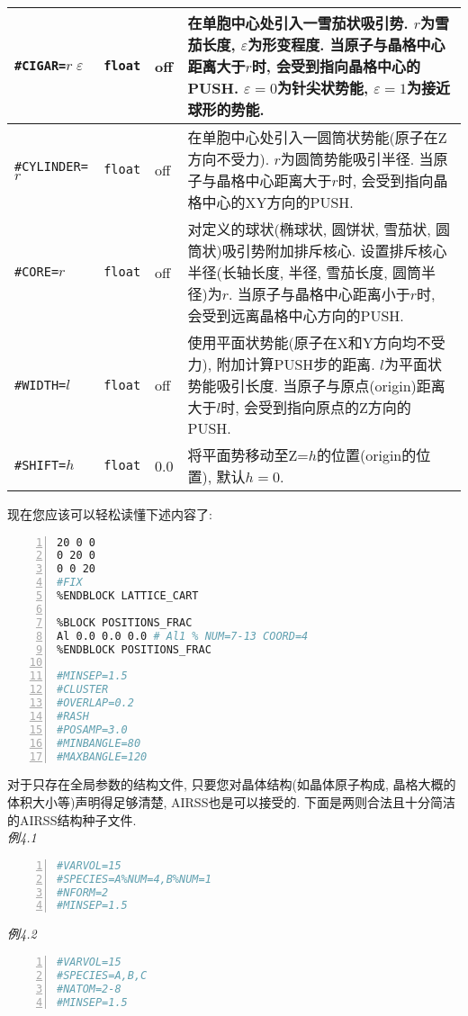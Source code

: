 \documentclass[a4paper, 10pt]{article}
\begin{document}
\begin{center}
\begin{longtable}{m{10em}|m{4em}<{\centering}|m{3em}<{\centering}|m{15em}}
\midrule
\verb|#CIGAR=|\(r\;\varepsilon\) & \verb|float| & off & 在单胞中心处引入一雪茄状吸引势. \(r\)为雪茄长度, \(\varepsilon\)为形变程度. 当原子与晶格中心距离大于\(r\)时, 会受到指向晶格中心的PUSH. \(\varepsilon=0\)为针尖状势能, \(\varepsilon=1\)为接近球形的势能. \\
\midrule
\verb|#CYLINDER=|\(r\) & \verb|float| & off & 在单胞中心处引入一圆筒状势能(原子在Z方向不受力). \(r\)为圆筒势能吸引半径. 当原子与晶格中心距离大于\(r\)时, 会受到指向晶格中心的XY方向的PUSH.\\
\midrule
\verb|#CORE=|\(r\) & \verb|float| & off & 对定义的球状(椭球状, 圆饼状, 雪茄状, 圆筒状)吸引势附加排斥核心. 设置排斥核心半径(长轴长度, 半径, 雪茄长度, 圆筒半径)为\(r\). 当原子与晶格中心距离小于\(r\)时, 会受到远离晶格中心方向的PUSH.\\
\midrule
\verb|#WIDTH=|\(l\)& \verb|float| & off & 使用平面状势能(原子在X和Y方向均不受力), 附加计算PUSH步的距离. \(l\)为平面状势能吸引长度. 当原子与原点(origin)距离大于\(l\)时, 会受到指向原点的Z方向的PUSH.\\
\midrule
\verb|#SHIFT=|\(h\)& \verb|float|& 0.0  & 将平面势移动至Z=\(h\)的位置(origin的位置), 默认\(h=0\).\\
\bottomrule
\end{longtable}
\end{center}

现在您应该可以轻松读懂下述内容了:

\begin{lstlisting}[language={bash},numbers=left]
%BLOCK LATTICE_CART
20 0 0
0 20 0
0 0 20
#FIX
%ENDBLOCK LATTICE_CART

%BLOCK POSITIONS_FRAC
Al 0.0 0.0 0.0 # Al1 % NUM=7-13 COORD=4
%ENDBLOCK POSITIONS_FRAC

#MINSEP=1.5
#CLUSTER
#OVERLAP=0.2
#RASH
#POSAMP=3.0
#MINBANGLE=80
#MAXBANGLE=120
\end{lstlisting}

对于只存在全局参数的结构文件, 只要您对晶体结构(如晶体原子构成, 晶格大概的体积大小等)声明得足够清楚, AIRSS也是可以接受的.  下面是两则合法且十分简洁的AIRSS结构种子文件.\\
\emph{例4.1}
\begin{lstlisting}[language={bash},numbers=left]
#VARVOL=15
#SPECIES=A%NUM=4,B%NUM=1
#NFORM=2 
#MINSEP=1.5
\end{lstlisting}
\emph{例4.2}
\begin{lstlisting}[language={bash},numbers=left]
#VARVOL=15 
#SPECIES=A,B,C
#NATOM=2-8
#MINSEP=1.5        
\end{lstlisting}
\end{document}
